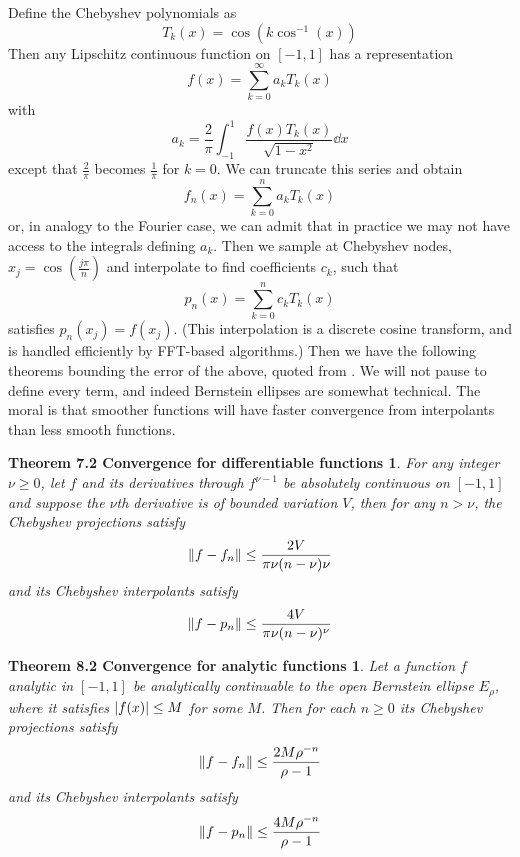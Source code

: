 Define the Chebyshev polynomials as 
\[  T_k(x) = \cos(k \cos^{-1}(x))\]
Then any Lipschitz continuous function on $[-1,1]$ has a representation 
\[ f(x) = \sum_{k=0}^{\infty} a_k T_k(x) \]
with
\[ a_k = \frac{2}{\pi} \int_{-1}^{1} \frac{f(x) T_k(x)}{\sqrt{1-x^2}} \dd{x} \]
except that $\frac{2}{\pi}$ becomes $\frac{1}{\pi}$ for $k=0$.  
We can truncate this series and obtain 
\[ f_n(x) = \sum_{k=0}^{n} a_k T_k(x) \]
or, in analogy to the Fourier case, we can admit that in practice we may not have access to the integrals defining $a_k$.  Then we sample at Chebyshev nodes, $x_j = \cos \left(  \frac{j \pi}{n} \right)$ and interpolate to find coefficients $c_k$, such that\[p_n(x) =   \sum_{k=0}^{n} c_k T_k(x) \]
satisfies $p_n(x_j) = f(x_j)$.  (This interpolation is a discrete cosine transform, and is handled efficiently by FFT-based algorithms.)  Then we have the following theorems bounding the error of the above, quoted from \cite{trefethenATAP}.  We will not pause to define every term, and indeed Bernstein ellipses are somewhat technical.  The moral is that smoother functions will have faster convergence from interpolants than less smooth functions.
\newtheorem*{ATAP7-2}{Theorem 7.2 Convergence for differentiable functions}
\begin{ATAP7-2}
	For any integer $\nu \ge 0$, let $f$ and its derivatives through $f^{\nu -1}$ be absolutely continuous on $[-1,1]$ and suppose the $\nu$th derivative is of bounded variation $V$, then for any $n > \nu$, the Chebyshev projections satisfy 
	\[  \norm{f - f_n} \leq \frac{2V}{\pi \nu (n - \nu)\nu} \]
	and its Chebyshev interpolants satisfy
	\[ \norm {f- p_n} \leq \frac{4V}{\pi \nu (n-\nu)^{\nu}}\]
\end{ATAP7-2}
\newtheorem*{ATAP8-2}{Theorem 8.2 Convergence for analytic functions}
\begin{ATAP8-2}
	Let a function $f$ analytic in $[-1,1]$ be analytically continuable to the open Bernstein ellipse $E_\rho$, where it satisfies $\abs{f(x)}\leq M$ for some $M$.  Then for each $n \geq 0$ its Chebyshev projections satisfy 
	\[  \norm{f - f_n} \leq \frac{2 M \rho^{-n} }{\rho - 1} \]
	and its Chebyshev interpolants satisfy
	\[ \norm {f- p_n} \leq \frac{4 M \rho^{-n} }{\rho - 1}\]
\end{ATAP8-2}




